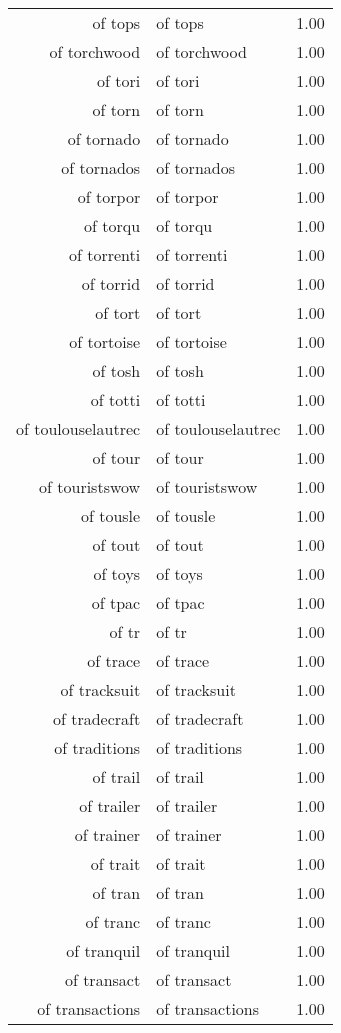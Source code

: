 \begin{table}[ht]
\begin{tabular}{rlr}
  of tops & of tops & 1.00 \\ 
  of torchwood & of torchwood & 1.00 \\ 
  of tori & of tori & 1.00 \\ 
  of torn & of torn & 1.00 \\ 
  of tornado & of tornado & 1.00 \\ 
  of tornados & of tornados & 1.00 \\ 
  of torpor & of torpor & 1.00 \\ 
  of torqu & of torqu & 1.00 \\ 
  of torrenti & of torrenti & 1.00 \\ 
  of torrid & of torrid & 1.00 \\ 
  of tort & of tort & 1.00 \\ 
  of tortoise & of tortoise & 1.00 \\ 
  of tosh & of tosh & 1.00 \\ 
  of totti & of totti & 1.00 \\ 
  of toulouselautrec & of toulouselautrec & 1.00 \\ 
  of tour & of tour & 1.00 \\ 
  of touristswow & of touristswow & 1.00 \\ 
  of tousle & of tousle & 1.00 \\ 
  of tout & of tout & 1.00 \\ 
  of toys & of toys & 1.00 \\ 
  of tpac & of tpac & 1.00 \\ 
  of tr & of tr & 1.00 \\ 
  of trace & of trace & 1.00 \\ 
  of tracksuit & of tracksuit & 1.00 \\ 
  of tradecraft & of tradecraft & 1.00 \\ 
  of traditions & of traditions & 1.00 \\ 
  of trail & of trail & 1.00 \\ 
  of trailer & of trailer & 1.00 \\ 
  of trainer & of trainer & 1.00 \\ 
  of trait & of trait & 1.00 \\ 
  of tran & of tran & 1.00 \\ 
  of tranc & of tranc & 1.00 \\ 
  of tranquil & of tranquil & 1.00 \\ 
  of transact & of transact & 1.00 \\ 
  of transactions & of transactions & 1.00 \\ 

\end{tabular}
\end{table}

